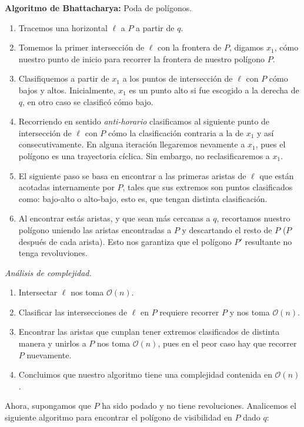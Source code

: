 \textbf{Algoritmo de Bhattacharya:} Poda de polígonos.
\begin{enumerate}
\item Tracemos una horizontal $\ell$ a $P$ a partir de $q$.
\item Tomemos la primer intersección de $\ell$ con la frontera de $P$, digamos $x_1$, cómo nuestro punto de inicio para recorrer
  la frontera de nuestro polígono $P$.
\item Clasifiquemos a partir de $x_1$ a los puntos de intersección de $\ell$ con $P$ cómo bajos y altos. Inicialmente, $x_1$
  es un punto alto si fue escogido a la derecha de $q$, en otro caso se clasificó cómo bajo.
\item Recorriendo en sentido \textit{anti-horario} clasificamos al siguiente punto de intersección de $\ell$ con $P$ cómo
  la clasificación contraria a la de $x_1$ y así consecutivamente. En alguna iteración llegaremos nevamente a $x_1$, pues
  el polígono es una trayectoria cíclica. Sin embargo, no reclasificaremos a $x_1$.
\item El siguiente paso se basa en encontrar a las primeras aristas de $\ell$ que están acotadas internamente por $P$, tales
  que sus extremos son puntos clasificados como: bajo-alto o alto-bajo, esto es, que tengan distinta clasificación.
\item Al encontrar estás aristas, y que sean más cercanas a $q$, recortamos nuestro polígono uniendo las aristas encontradas
  a $P$ y descartando el resto de $P$ ($P$ después de cada arista). Esto nos garantiza que el polígono $P'$ resultante no tenga
  revoluviones.
\end{enumerate}
\textit{Análisis de complejidad.}
\begin{enumerate}
\item Intersectar $\ell$ nos toma $\mathcal{O}(n)$.
\item Clasificar las intersecciones de $\ell$ en $P$ requiere recorrer $P$ y nos toma $\mathcal{O}(n)$.
\item Encontrar las aristas que cunplan tener extremos clasificados de distinta manera y unirlos a $P$ nos
  toma $\mathcal{O}(n)$, pues en el peor caso hay que recorrer $P$ nuevamente.
\item Concluimos que nuestro algoritmo tiene una complejidad contenida en $\mathcal{O}(n)$.
\end{enumerate}
Ahora, supongamos que $P$ ha sido podado y no tiene revoluciones. Analicemos el siguiente algoritmo para encontrar el
polígono de visibilidad en $P$ dado $q$:\newline

